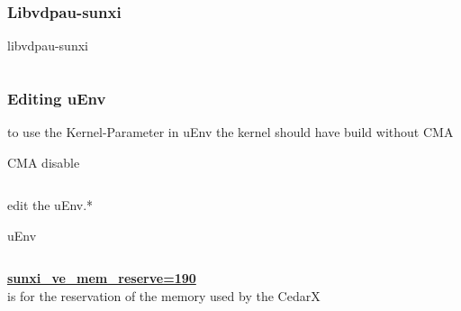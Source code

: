 \documentclass[11pt, a4paper,ngerman]{article}
\begin{document}
\subsubsection{Libvdpau-sunxi}

\begin{mintedbox}[breakable=true,
 bottomrule=0.5mm,
 width=\paperwidth-3cm,
 boxsep=1mm, 
 enhanced=true,
 colframe = monoblack,
 drop fuzzy shadow,
 colback = black
 ]{libvdpau-sunxi}%
 

     \inputminted[firstline=24,lastline=28, 
     linenos=true, framesep=2mm, mathescape, numbersep=5pt,tabsize=4,%
]{bash}{includes/software.sh}%

\end{mintedbox}%

\subsubsection{Editing uEnv}

to use the Kernel-Parameter in uEnv the kernel should have build without CMA

\begin{mintedbox}[breakable=true,
 bottomrule=0.5mm,
 width=\paperwidth-3cm,
 boxsep=1mm, 
 enhanced=true,
 colframe = monoblack,
 drop fuzzy shadow,
 colback = black
 ]{CMA disable}%
 

     \inputminted[firstline=1,lastline=28, 
     linenos=true, framesep=2mm, mathescape, numbersep=5pt,tabsize=4,%
]{bash}{includes/kernel.conf}%

\end{mintedbox}%
\vspace{0.4cm}

edit the uEnv.*  \\


\begin{mintedbox}[breakable=true,
 bottomrule=0.5mm,
 width=\paperwidth-3cm,
 boxsep=1mm, 
 enhanced=true,
 colframe = monoblack,
 drop fuzzy shadow,
 colback = black
 ]{uEnv}%
 

     \inputminted[firstline=1,lastline=28, 
     linenos=true, framesep=2mm, mathescape, numbersep=5pt,tabsize=4,%
]{bash}{includes/uEnv.txt}%

\end{mintedbox}%
\vspace{0.4cm}

\color{monoorange}
\underline{\textbf{sunxi\_ve\_mem\_reserve=190}} \\
\color{black}
is for the reservation of the memory used by the CedarX \\
\end{document}
